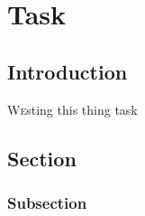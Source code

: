 \chapter{Task}

\section{Introduction}

\lettrine{W}esting this thing task

\newpage

\section{Section}
\subsection{Subsection}